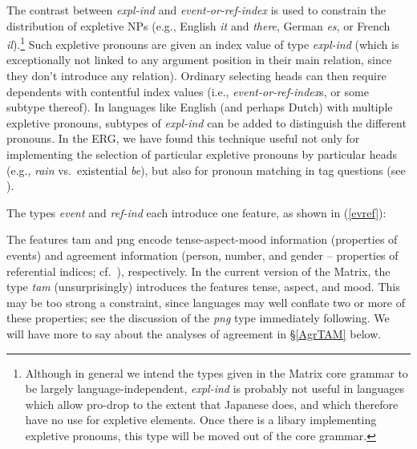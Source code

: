 \documentclass[12pt]{article}
\newcommand{\ees}{\eenumsentence}
\begin{document}
The contrast between {\it expl-ind} and {\it event-or-ref-index} is
used to constrain the distribution of expletive NPs (e.g., English
{\it it} and {\it there}, German {\it es}, or French {\it
il}).\footnote{Although in general we intend the types given in the
Matrix core grammar to be largely language-independent, 
{\it expl-ind} is probably not useful in languages
which allow pro-drop to the extent that Japanese does, and which therefore
have no use for expletive elements.  Once there is a libary implementing
expletive pronouns, this type will be moved out of the core grammar.}  Such expletive pronouns are given
an {\sc index} value of type {\it expl-ind} (which is exceptionally not
linked to any argument position in their main relation, since they
don't introduce any relation).  Ordinary selecting heads can then require 
dependents with
contentful {\sc index} values (i.e., {\it event-or-ref-index}s, or
some subtype thereof).  In languages like English (and perhaps Dutch) with
multiple expletive pronouns, subtypes of {\it expl-ind} can be added
to distinguish the different pronouns.  In the ERG, we have found
this technique useful not only for implementing the selection of 
particular expletive pronouns by particular heads (e.g., {\it rain} vs.\
existential {\it be}), but also for pronoun matching in tag questions
(see \citeboth{Ben:Fli:99}).

The types {\it event} and {\it ref-ind} each introduce one feature,
as shown in (\ref{evref}):

\ees{\label{evref}
\item \begin{avm}
{\it event}: \[ tam & tam \]
\end{avm}

\item \begin{avm}
{\it ref-ind}: \[ png & png \]
\end{avm}
}
%
The features {\sc tam} and {\sc png} encode tense-aspect-mood
information (properties of events) and agreement information (person,
number, and gender -- properties of referential indices; cf.\
), respectively.  In the current version of the
Matrix, the type {\it tam} (unsurprisingly) introduces the
features {\sc tense}, {\sc aspect}, and {\sc mood}.  This may be too
strong a constraint, since languages may well conflate two or more of
these properties; see the discussion of the {\it png} type immediately
following.  We will have more to say about the analyses of agreement in
\S\ref{AgrTAM} below.
\end{document}
